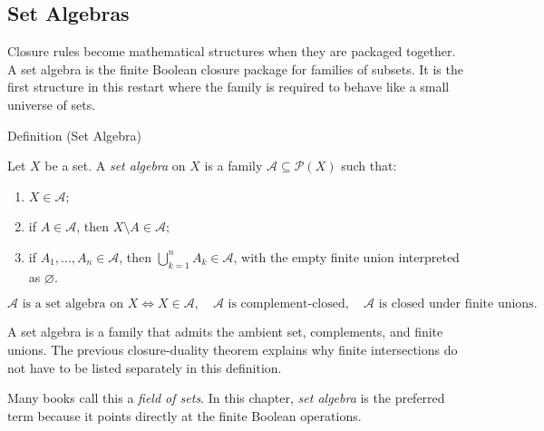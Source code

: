 
\subsection{Set Algebras}

\begin{exposition}
Closure rules become mathematical structures when they are packaged together.
A set algebra is the finite Boolean closure package for families of subsets.
It is the first structure in this restart where the family is required to
behave like a small universe of sets.
\end{exposition}

\begin{definitionbox}{Definition (Set Algebra)}
\begin{definition}\label{def:set-algebra}
Let \(X\) be a set.  A \emph{set algebra} on \(X\) is a family
\(\mathcal A\subseteq\mathcal P(X)\) such that:
\begin{enumerate}[label=(\roman*)]
\item \(X\in\mathcal A\);
\item if \(A\in\mathcal A\), then \(X\setminus A\in\mathcal A\);
\item if \(A_1,\dots,A_n\in\mathcal A\), then
      \(\bigcup_{k=1}^{n}A_k\in\mathcal A\), with the empty finite union
      interpreted as \(\varnothing\).
\end{enumerate}
\end{definition}
\end{definitionbox}

\begin{remark*}
\[
\mathcal A\text{ is a set algebra on }X
\iff
X\in\mathcal A,\quad
\mathcal A\text{ is complement-closed},\quad
\mathcal A\text{ is closed under finite unions}.
\]
\end{remark*}

\begin{remark*}[Interpretation]
A set algebra is a family that admits the ambient set, complements, and finite
unions.  The previous closure-duality theorem explains why finite
intersections do not have to be listed separately in this definition.
\end{remark*}

\begin{remark*}[Exposition]
Many books call this a \emph{field of sets}.  In this chapter, \emph{set
algebra} is the preferred term because it points directly at the finite
Boolean operations.
\end{remark*}

